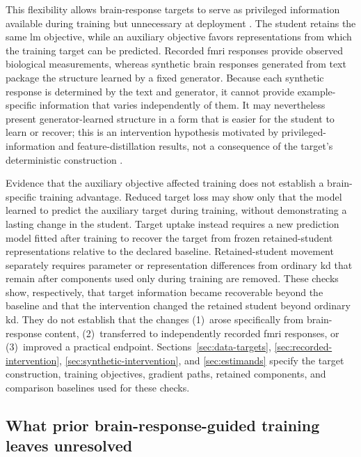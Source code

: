 This flexibility allows brain-response targets to serve as privileged information available during training but unnecessary at deployment \autocite{lopezpaz2016}.
The student retains the same \ac{lm} objective, while an auxiliary objective favors representations from which the training target can be predicted.
Recorded \ac{fmri} responses provide observed biological measurements, whereas synthetic brain responses generated from text package the structure learned by a fixed generator.
Because each synthetic response is determined by the text and generator, it cannot provide example-specific information that varies independently of them.
It may nevertheless present generator-learned structure in a form that is easier for the student to learn or recover; this is an intervention hypothesis motivated by privileged-information and feature-distillation results, not a consequence of the target's deterministic construction \autocite{lopezpaz2016,saadi2025}.

Evidence that the auxiliary objective affected training does not establish a brain-specific training advantage.
Reduced target loss may show only that the model learned to predict the auxiliary target during training, without demonstrating a lasting change in the student.
Target uptake instead requires a new prediction model fitted after training to recover the target from frozen retained-student representations relative to the declared baseline.
Retained-student movement separately requires parameter or representation differences from ordinary \ac{kd} that remain after components used only during training are removed.
These checks show, respectively, that target information became recoverable beyond the baseline and that the intervention changed the retained student beyond ordinary \ac{kd}.
They do not establish that the changes (1)\ arose specifically from brain-response content, (2)\ transferred to independently recorded \ac{fmri} responses, or (3)\ improved a practical endpoint.
Sections~\ref{sec:data-targets}, \ref{sec:recorded-intervention}, \ref{sec:synthetic-intervention}, and \ref{sec:estimands} specify the target construction, training objectives, gradient paths, retained components, and comparison baselines used for these checks.

\subsection{What prior brain-response-guided training leaves unresolved}
\label{sec:prior-gap}


